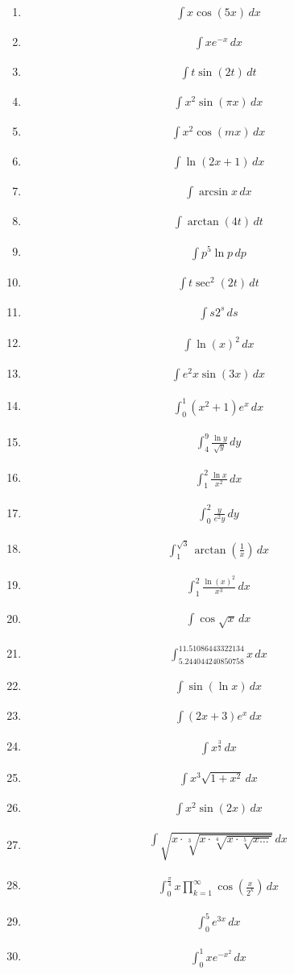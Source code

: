 \documentclass[twoside, fleqn,12pt, letterpaper]{article}
\newcommand{\makeitem}[1]{\item \begin{align*} {#1}
  \end{align*}}
\begin{document}
\begin{multicols}{2}
\begin{enumerate}
  \makeitem {\int x\cos(5x) \, dx}
  
  \makeitem {\int xe^{-x} \, dx}
  
  \makeitem {\int t\sin(2t) \, dt}
  
  \makeitem {\int x^2 \sin(\pi x) \, dx}
  
  \makeitem {\int x^2 \cos(mx) \, dx}
  
  \makeitem {\int \ln(2x+1) \, dx}
  
  \makeitem {\int \arcsin x \, dx}
  
  \makeitem {\int \arctan(4t) \, dt}
  
  \makeitem {\int p^5\ln p \, dp}
  
  \makeitem {\int t\sec^2(2t) \, dt}
  
  \makeitem {\int s2^s \, ds}
  
  \makeitem {\int \ln (x)^2 \, dx}
  
  \makeitem {\int e^2x\sin(3x) \, dx}
  
  \makeitem {\int_{0}^{1} (x^2+1)e^x  \, dx}
  
  \makeitem {\int_{4}^{9}\frac{\ln y}{\sqrt{y}} \, dy}
  
  \makeitem {\int_{1}^{2}\frac{\ln x}{x^2} \, dx}
  
  \makeitem {\int_{0}^{2}\frac{y}{e^2y} \, dy}
  
  \makeitem {\int_{1}^{\sqrt{3}}\arctan\left(\frac{1}{x}\right) \, dx}
  
  \makeitem {\int_{1}^{2}\frac{\ln(x)^2}{x^3} \, dx}
  
  \makeitem {\int \cos\sqrt{x}\,dx}
  
\makeitem {{\int_{5.244044240850758}^{11.51086443322134}x \, dx}}
  
  \makeitem  {\int \sin(\ln x) \, dx}
  
  \makeitem {\int (2x+3)e^x \, dx}
  
  \makeitem  {\int x^{\frac{3}{2}} \, dx}
  
  \makeitem  {\int x^3\sqrt{1+x^2} \, dx}
  
  \makeitem  {\int x^2\sin(2x) \, dx}
  
  \makeitem {\int\sqrt{x\cdot\sqrt[3]{x\cdot\sqrt[4]{x\cdot\sqrt[5]{x\ldots}}}}\, dx}
  
  \makeitem{\int_{0}^{\frac{\pi}{4}}x\prod_{k=1}^{\infty} \cos\left(\frac{x}{2^k}\right)\, dx}
  
  \makeitem{\int_{0}^{5}e^{3x} \, dx}
  
  \makeitem{\int_{0}^{1}xe^{-x^2} \, dx} 
  

\end{enumerate}
\end{multicols}
\end{document}
